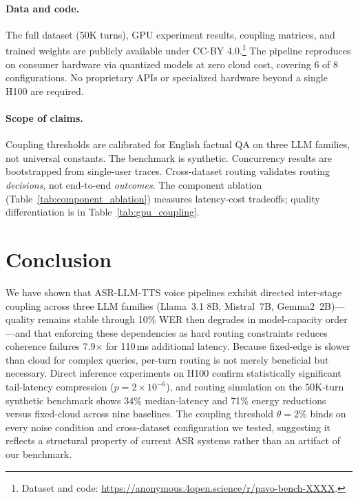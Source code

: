 \documentclass{article}
\begin{document}
\paragraph{Data and code.}
The full dataset (50K turns), GPU experiment results, coupling matrices, and trained weights are publicly available under CC-BY 4.0.\footnote{Dataset and code: \url{https://anonymous.4open.science/r/pavo-bench-XXXX}.} The pipeline reproduces on consumer hardware via quantized models at zero cloud cost, covering 6 of 8 configurations. No proprietary APIs or specialized hardware beyond a single H100 are required.

\paragraph{Scope of claims.}
Coupling thresholds are calibrated for English factual QA on three LLM families, not universal constants. The benchmark is synthetic. Concurrency results are bootstrapped from single-user traces. Cross-dataset routing validates routing \emph{decisions}, not end-to-end \emph{outcomes}. The component ablation (Table~\ref{tab:component_ablation}) measures latency-cost tradeoffs; quality differentiation is in Table~\ref{tab:gpu_coupling}.

\section{Conclusion}
\label{sec:conclusion}

We have shown that ASR-LLM-TTS voice pipelines exhibit directed inter-stage coupling across three LLM families (Llama~3.1 8B, Mistral~7B, Gemma2~2B)---quality remains stable through 10\% WER then degrades in model-capacity order---and that enforcing these dependencies as hard routing constraints reduces coherence failures 7.9$\times$ for 110\,ms additional latency. Because fixed-edge is slower than cloud for complex queries, per-turn routing is not merely beneficial but necessary. Direct inference experiments on H100 confirm statistically significant tail-latency compression ($p = 2\times10^{-6}$), and routing simulation on the 50K-turn synthetic benchmark shows 34\% median-latency and 71\% energy reductions versus fixed-cloud across nine baselines. The coupling threshold $\theta=2\%$ binds on every noise condition and cross-dataset configuration we tested, suggesting it reflects a structural property of current ASR systems rather than an artifact of our benchmark.
\end{document}
